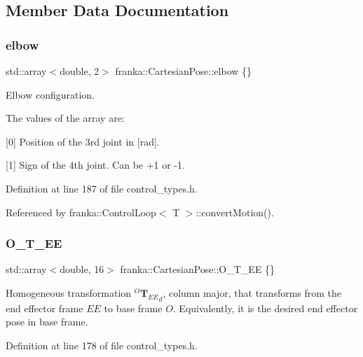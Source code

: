 \subsection{Member Data Documentation}
\mbox{\label{classfranka_1_1CartesianPose_abef660743df9cf94d11c556d9c3d25be}} 
\subsubsection{\texorpdfstring{elbow}{elbow}}
{\footnotesize\ttfamily std\+::array$<$double, 2$>$ franka\+::\+Cartesian\+Pose\+::elbow \{\}}

Elbow configuration.

The values of the array are\+:
\begin{DoxyItemize}
\item \mbox{[}0\mbox{]} Position of the 3rd joint in \mbox{[}rad\mbox{]}.
\item \mbox{[}1\mbox{]} Sign of the 4th joint. Can be +1 or -\/1. 
\end{DoxyItemize}

Definition at line 187 of file control\+\_\+types.\+h.



Referenced by franka\+::\+Control\+Loop$<$ T $>$\+::convert\+Motion().

\mbox{\label{classfranka_1_1CartesianPose_a406e53e3d8fe594a11888f516eb4bf7d}} 
\subsubsection{\texorpdfstring{O\+\_\+\+T\+\_\+\+EE}{O\_T\_EE}}
{\footnotesize\ttfamily std\+::array$<$double, 16$>$ franka\+::\+Cartesian\+Pose\+::\+O\+\_\+\+T\+\_\+\+EE \{\}}

Homogeneous transformation $^O{\mathbf{T}_{EE}}_{d}$, column major, that transforms from the end effector frame $EE$ to base frame $O$. Equivalently, it is the desired end effector pose in base frame. 

Definition at line 178 of file control\+\_\+types.\+h.



